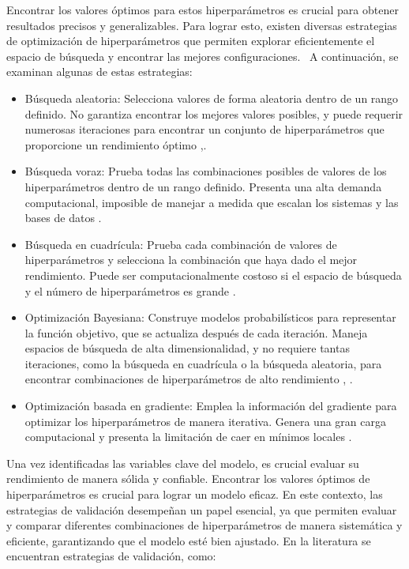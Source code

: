 Encontrar los valores óptimos para estos hiperparámetros es crucial para obtener resultados precisos y generalizables. Para lograr esto, existen diversas estrategias de optimización de hiperparámetros que permiten explorar eficientemente el espacio de búsqueda y encontrar las mejores configuraciones.  A continuación, se examinan algunas de estas estrategias:

\begin{itemize}
	\item Búsqueda aleatoria: Selecciona valores de forma aleatoria dentro de un rango definido. No garantiza encontrar los mejores valores posibles, y puede requerir numerosas iteraciones para encontrar un conjunto de hiperparámetros que proporcione un rendimiento óptimo \citep{geron2022hands},\citep{zoller2021benchmark}.
	\item Búsqueda voraz: Prueba todas las combinaciones posibles de valores de los hiperparámetros dentro de un rango definido. Presenta una alta demanda computacional, imposible de manejar a medida que escalan los sistemas y las bases de datos \citep{zoller2021benchmark}.
	\item Búsqueda en cuadrícula: Prueba cada combinación de valores de hiperparámetros y selecciona la combinación que haya dado el mejor rendimiento. Puede ser computacionalmente costoso si el espacio de búsqueda y el número de hiperparámetros es grande \citep{he2021automl}.
	\item Optimización Bayesiana: Construye modelos probabilísticos para representar la función objetivo, que se actualiza después de cada iteración. Maneja espacios de búsqueda de alta dimensionalidad, y no requiere tantas iteraciones, como la búsqueda en cuadrícula o la búsqueda aleatoria, para encontrar combinaciones de hiperparámetros de alto rendimiento \citep{hutter2019automated}, \citep{he2021automl}.
	\item Optimización basada en gradiente: Emplea la información del gradiente para optimizar los hiperparámetros de manera iterativa. Genera una gran carga computacional y presenta la limitación de caer en mínimos locales \citep{zoller2021benchmark}.
\end{itemize} 

Una vez identificadas las variables clave del modelo, es crucial evaluar su rendimiento de manera sólida y confiable. Encontrar los valores óptimos de hiperparámetros es crucial para lograr un modelo eficaz. En este contexto, las estrategias de validación desempeñan un papel esencial, ya que permiten evaluar y comparar diferentes combinaciones de hiperparámetros de manera sistemática y eficiente, garantizando que el modelo esté bien ajustado. En la literatura se encuentran estrategias de validación, como:

